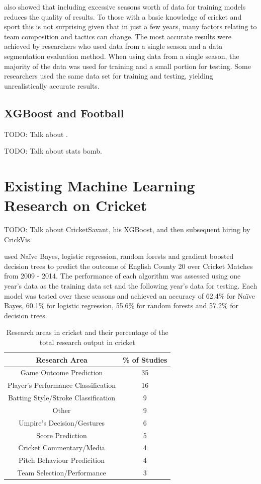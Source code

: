 \documentclass[12pt,a4paper]{report}
\theoremstyle{definition}
\begin{document}
\citet{horvat2020} also showed that including excessive seasons worth of data for training models reduces the quality of results. 
To those with a basic knowledge of cricket and sport this is not surprising given that in just a few years, many factors relating to team composition and tactics can change. 
The most accurate results were achieved by researchers who used data from a single season and a data segmentation evaluation method. 
When using data from a single season, the majority of the data was used for training and a small portion for testing. 
Some researchers used the same data set for training and testing, yielding unrealistically accurate results.

\subsection{XGBoost and Football}

TODO: Talk about \citep{Blumberg2020}.

TODO: Talk about stats bomb.

\section{Existing Machine Learning Research on Cricket} \label{sec:CrickSurvey}

TODO: Talk about CricketSavant, his XGBoost, and then subsequent hiring by CrickVis.

\citet{KampakisStylianos2015} used Naïve Bayes, logistic regression, random forests and gradient boosted decision trees to predict the outcome of English County 20 over Cricket Matches from 2009 - 2014. 
The performance of each algorithm was assessed using one year's data as the training data set and the following year's data for testing. 
Each model was tested over these seasons and achieved an accuracy of 62.4\% for Naïve Bayes, 60.1\% for logistic regression, 55.6\% for random forests and 57.2\% for decision trees.

\begin{table}[H] \label{tab:ResearchCrick}
	\centering
	\caption{Research areas in cricket and their percentage of the total research output in cricket \citep{Wickramasinghe2022}}
	\begin{tabular}{||c c ||} 
		\hline
		Research Area & \% of Studies \\ [0.5ex] 
		\hline\hline
		Game Outcome Prediction & 35 \\ 
		\hline
		Player's Performance Classification & 16 \\
		\hline
		Batting Style/Stroke Classification & 9 \\
		\hline
		Other & 9 \\
		\hline
		Umpire's Decision/Gestures & 6 \\
		\hline
		Score Prediction & 5 \\
		\hline
		Cricket Commentary/Media & 4 \\
		\hline
		Pitch Behaviour Predicition & 4 \\
		\hline
		Team Selection/Performance & 3 \\ [1ex] 
	\hline
	\end{tabular}
\end{table}
\end{document}
